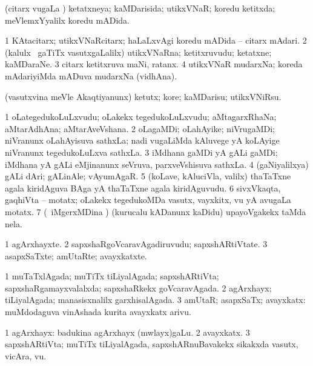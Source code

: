 \bentry
{}
\gl{\gu}
\bmng
\emng
(citarx \mo vugaLa \vi) ketatxneya; kaMDarisida; utikxVNaR; koredu ketitxda; meVlemxYyalilx koredu mADida. \eentry

\bentry
{}
\gl{\nA}
\bmng
\bnum
\num{1} KAtacitarx; utikxVNaRcitarx; haLaLxvAgi koredu mADida -- citarx mAdari. 
\num{2} (kalulx \mo\ gaTiTx vasutxgaLalilx) utikxVNaRna; ketitxruvudu; ketatxne; kaMDaraNe. 
\num{3} citarx ketitxruva maNi, ratanx. 
\num{4} utikxVNaR mudarxNa; koreda mAdariyiMda mADuva mudarxNa (vidhAna). 
\enum
\emng
\eentry

\bentry
{}
\gl{\sakirx}
\bmng
(vasutxvina meVle Akaqtiyanunx) ketutx; kore; kaMDarisu; utikxVNiRsu. 
\emng
\eentry

\bentry
{}
\gl{\nA}
\bmng
\bnum
\num{1} oLategedukoLuLxvudu; oLakekx tegedukoLuLxvudu; aMtagarxRhaNa; aMtarAdhAna; aMtarAveVshana. 
\num{2} oLagaMDi; oLahAyike; niVrugaMDi; niVranunx oLahAyisuva sathxLa; nadi \mo vugaLiMda kAluvege yA koLAyige niVranunx tegedukoLuLxva sathxLa. 
\num{3} iMdhana gaMDi yA gALi gaMDi; iMdhana yA gALi eMjinanunx seVruva, parxveVshisuva sathxLa. 
\num{4} (gaNiyalilxya) gALi dAri; gALinAle; vAyumAgaR. 
\num{5} (koLave, kAluciVla, \mo valilx) thaTaTxne agala kiridAguva BAga yA thaTaTxne agala kiridAguvudu. 
\num{6} sivxVkaqta, gaqhiVta -- motatx; oLakekx tegedukoMDa vasutx, vayxkitx, \mo vu yA avugaLa motatx. 
\num{7} (\kanu\ iMgerxMDina \parx) (kurucalu kADanunx kaDidu) upayoVgakekx taMda nela. 
\enum
\emng
\eentry

\bentry
{}
\gl{\nA}
\bmng
\bnum
\num{1} agArxhayxte. 
\num{2} sapxshaRgoVcaravAgadiruvudu; sapxshARtiVtate. 
\num{3} asapxSaTxte; amUtaRte; avayxkatxte. 
\enum
\emng
\eentry

\bentry
{}
\gl{\gu}
\bmng
\bnum
\num{1} muTaTxlAgada; muTiTx tiLiyalAgada; sapxshARtiVta; sapxshaRgamayxvalalxda; sapxshaRkekx goVcaravAgada. 
\num{2} agArxhayx; tiLiyalAgada; manasisxnalilx garxhisalAgada. 
\num{3} amUtaR; asapxSaTx; avayxkatx:  muMdodaguva vinAshada kurita avayxkatx arivu. 
\enum
\emng
\eentry

\bentry
{}
\gl{\nA}
\bmng
\bnum
\num{1} agArxhayx:  badukina agArxhayx (mwlayx)gaLu. 
\num{2} avayxkatx. 
\num{3} sapxshARtiVta; muTiTx tiLiyalAgada, sapxshARnuBavakekx sikakxda vasutx, vicAra, \mo vu. 
\enum
\emng
\eentry

